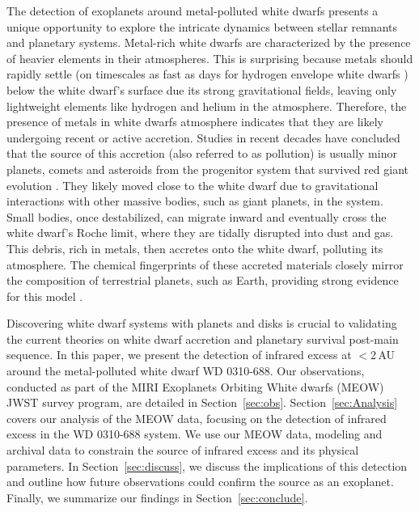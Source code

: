 \documentclass[twocolumn]{aastex631}
\begin{document}
The detection of exoplanets around metal-polluted white dwarfs presents a unique opportunity to explore the intricate dynamics between stellar remnants and planetary systems. {Metal-rich white dwarfs are characterized by the presence of heavier elements in their atmospheres. This is surprising because metals should rapidly settle (on timescales as fast as days for hydrogen envelope white dwarfs \citealt{2006ApJ...646..474K,2006A&A...453.1051K,2007ApJ...663.1285J,2009A&A...498..517K})  below the white dwarf's surface due its strong gravitational fields, leaving only lightweight elements like hydrogen and helium in the atmosphere. 
Therefore, the presence of metals in white dwarfs atmosphere indicates that they are likely undergoing recent or active accretion. 
Studies in recent decades have concluded that the source of this accretion (also referred to as pollution) is usually minor planets, comets and asteroids from the progenitor system that survived red giant evolution \citep{1986ApJ...302..462A, 2003ApJ...584L..91J,2010ApJ...709..950K,2010ApJ...719..803D,2012ApJ...747..148D,2024RvMG...90..141V}. They likely moved close to the white dwarf due to gravitational interactions with other massive bodies, such as giant planets, in the system.} Small bodies, once destabilized, can migrate inward and eventually cross the white dwarf’s Roche limit, where they are tidally disrupted into dust and gas. This debris, rich in metals, then accretes onto the white dwarf, polluting its atmosphere. The chemical fingerprints of these accreted materials closely mirror the composition of terrestrial planets, such as Earth, providing strong evidence for this model \citep{2011ApJ...732...90M, 2019AJ....158..242X, 2023PSJ.....4..136T}.

Discovering white dwarf systems with planets and disks is crucial to validating the current theories on white dwarf accretion and planetary survival post-main sequence. In this paper, we present the detection of infrared excess at $<$2\,AU around the metal-polluted white dwarf WD 0310-688. Our observations, conducted as part of the MIRI Exoplanets Orbiting White dwarfs (MEOW) JWST survey program, are detailed in Section~\ref{sec:obs}. Section~\ref{sec:Analysis} covers our analysis of the MEOW data, focusing on the detection of infrared excess in the WD 0310-688 system. We use our MEOW data, modeling and archival data to constrain the source of infrared excess and its physical parameters. In Section~\ref{sec:discuss}, we discuss the implications of this detection and outline how future observations could confirm the source as an exoplanet. Finally, we summarize our findings in Section~\ref{sec:conclude}.
\end{document}

